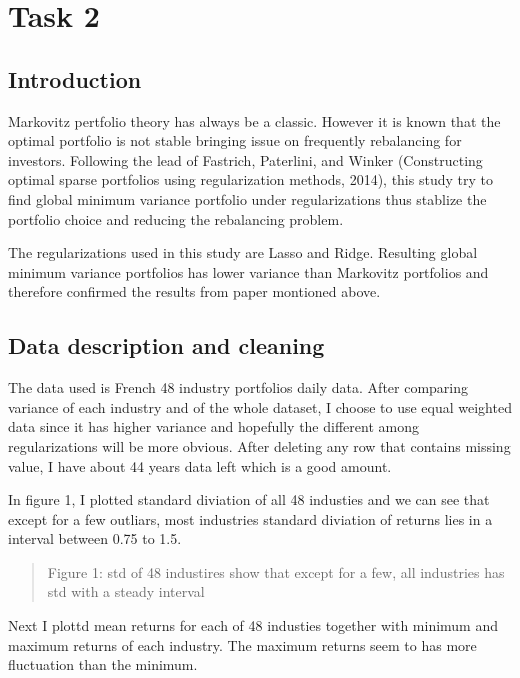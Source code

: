 \documentclass{article}
\newcommand{\ciapdf}[1]{\vspace*{-\parskip}\begin{center}\resizebox{0.75\textwidth}{!}{\texttt{[image: \#1]}}\end{center}}
\begin{document}
\section*{Task 2}

\subsection*{Introduction}

Markovitz pertfolio theory has always be a classic. However it is known that
the optimal portfolio is not stable bringing issue on frequently rebalancing
for investors. Following the lead of Fastrich, Paterlini, and Winker (Constructing
optimal sparse portfolios using regularization methods, 2014), this study
try to find global minimum variance portfolio under regularizations thus stablize
the portfolio choice and reducing the rebalancing problem.

The regularizations used in this study are Lasso and Ridge. Resulting global
minimum variance portfolios has lower variance than Markovitz portfolios and
therefore confirmed the results from paper montioned above.

\subsection*{Data description and cleaning}

The data used is French 48 industry portfolios daily data. After comparing variance
of each industry and of the whole dataset, I choose to use equal weighted data
since it has higher variance and hopefully the different among regularizations
will be more obvious. After deleting any row that contains missing value, I have
about 44 years data left which is a good amount.

In figure 1, I plotted standard diviation of all 48 industies and we can see that
except for a few outliars, most industries standard diviation of returns lies
in a interval between 0.75 to 1.5.

\ciapdf{Figure_1T2.pdf}

\begin{quote}
Figure 1: std of 48 industires show that except for a few, all industries has
std with a steady interval
\end{quote}

Next I plottd mean returns for each of 48 industies together with minimum and maximum
returns of each industry. The maximum returns seem to has more fluctuation than
the minimum.
\end{document}
